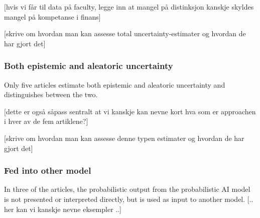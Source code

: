 [hvis vi får til data på faculty, legge inn at mangel på distinksjon kanskje skyldes mangel på kompetanse i finans]

[skrive om hvordan man kan assesse total uncertainty-estimater og hvordan de har gjort det]

\subsubsection{Both epistemic and aleatoric uncertainty}

Only five articles estimate both epistemic and aleatoric uncertainty and distinguishes between the two.

[dette er også såpass sentralt at vi kanskje kan nevne kort hva som er approachen i hver av de fem artiklene?]

[skrive om hvordan man kan assesse denne typen estimater og hvordan de har gjort det]

\subsubsection{Fed into other model}

In three of the articles, the probabilistic output from the probabilistic AI model is not presented or interpreted directly, but is used as input to another model. [.. her kan vi kanskje nevne eksempler ..]




